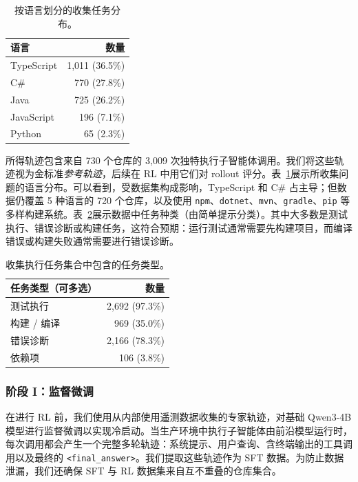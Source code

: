 \documentclass[sigconf,review]{acmart}
\begin{document}
\begin{table}[t]
\centering
\caption{按语言划分的收集任务分布。}
\label{dataset_languages}
\small
\begin{tabular}{lr}
\toprule
\textbf{语言} & \textbf{数量} \\
\midrule
TypeScript & 1{,}011 (36.5\%) \\
C\# & 770 (27.8\%) \\
Java & 725 (26.2\%) \\
JavaScript & 196 (7.1\%) \\
Python & 65 (2.3\%) \\
\midrule
\end{tabular}
\end{table}

所得轨迹包含来自 730 个仓库的 3{,}009 次独特执行子智能体调用。我们将这些轨迹视为金标准\textit{参考轨迹}，后续在 RL 中用它们对 rollout 评分。表~\ref{dataset_languages}展示所收集问题的语言分布。可以看到，受数据集构成影响，TypeScript 和 C\# 占主导；但数据仍覆盖 5 种语言的 720 个仓库，以及使用 \texttt{npm}、\texttt{dotnet}、\texttt{mvn}、\texttt{gradle}、\texttt{pip} 等多样构建系统。表~\ref{dataset_task_types}展示数据中任务种类（由简单提示分类）。其中大多数是测试执行、错误诊断或构建任务，这符合预期：运行测试通常需要先构建项目，而编译错误或构建失败通常需要进行错误诊断。

\begin{table}[t]
\centering
\caption{收集执行任务集合中包含的任务类型。}
\label{dataset_task_types}
\small
\begin{tabular}{lr}
\toprule
\textbf{任务类型（可多选）} & \textbf{数量} \\
\midrule
测试执行 & 2{,}692 (97.3\%) \\
构建 / 编译 & 969 (35.0\%) \\
错误诊断 & 2{,}166 (78.3\%) \\
依赖项 & 106 (3.8\%) \\
\bottomrule
\end{tabular}
\end{table}

\subsubsection{阶段 I：监督微调}
在进行 RL 前，我们使用从内部使用遥测数据收集的专家轨迹，对基础 Qwen3-4B 模型进行监督微调以实现冷启动。当生产环境中执行子智能体由前沿模型运行时，每次调用都会产生一个完整多轮轨迹：系统提示、用户查询、含终端输出的工具调用以及最终的 \texttt{<final\_answer>}。我们提取这些轨迹作为 SFT 数据。为防止数据泄漏，我们还确保 SFT 与 RL 数据集来自互不重叠的仓库集合。
\end{document}
